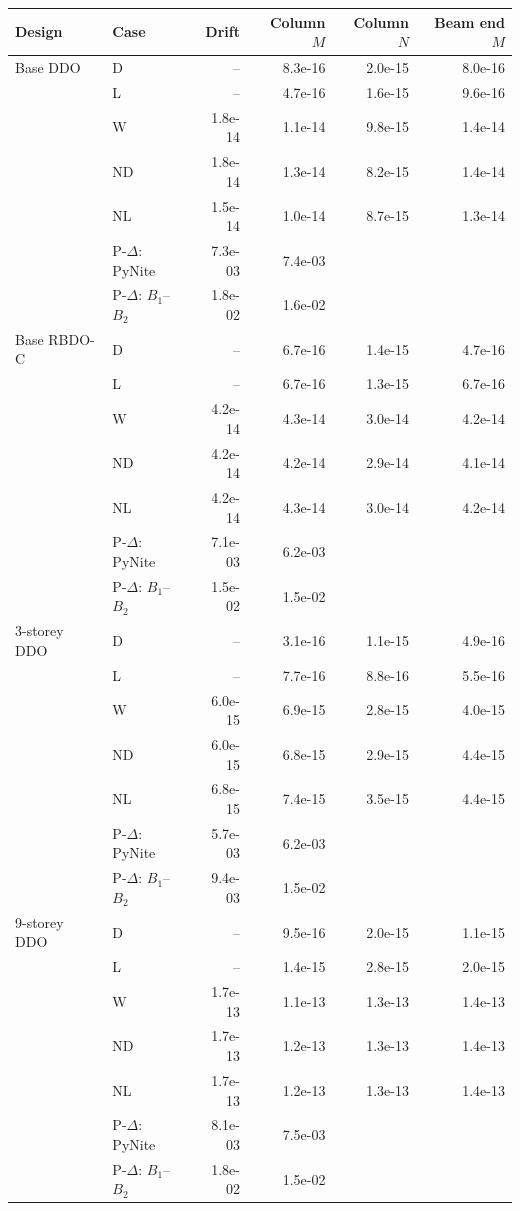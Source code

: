 \begin{tabular}{llrrrr}
\toprule
Design & Case & Drift & Column $M$ & Column $N$ & Beam end $M$ \\
\midrule
Base DDO & D & -- & 8.3e-16 & 2.0e-15 & 8.0e-16 \\
 & L & -- & 4.7e-16 & 1.6e-15 & 9.6e-16 \\
 & W & 1.8e-14 & 1.1e-14 & 9.8e-15 & 1.4e-14 \\
 & ND & 1.8e-14 & 1.3e-14 & 8.2e-15 & 1.4e-14 \\
 & NL & 1.5e-14 & 1.0e-14 & 8.7e-15 & 1.3e-14 \\
 & P-$\Delta$: PyNite & 7.3e-03 & 7.4e-03 & & \\
 & P-$\Delta$: $B_1$--$B_2$ & 1.8e-02 & 1.6e-02 & & \\
\midrule
Base RBDO-C & D & -- & 6.7e-16 & 1.4e-15 & 4.7e-16 \\
 & L & -- & 6.7e-16 & 1.3e-15 & 6.7e-16 \\
 & W & 4.2e-14 & 4.3e-14 & 3.0e-14 & 4.2e-14 \\
 & ND & 4.2e-14 & 4.2e-14 & 2.9e-14 & 4.1e-14 \\
 & NL & 4.2e-14 & 4.3e-14 & 3.0e-14 & 4.2e-14 \\
 & P-$\Delta$: PyNite & 7.1e-03 & 6.2e-03 & & \\
 & P-$\Delta$: $B_1$--$B_2$ & 1.5e-02 & 1.5e-02 & & \\
\midrule
3-storey DDO & D & -- & 3.1e-16 & 1.1e-15 & 4.9e-16 \\
 & L & -- & 7.7e-16 & 8.8e-16 & 5.5e-16 \\
 & W & 6.0e-15 & 6.9e-15 & 2.8e-15 & 4.0e-15 \\
 & ND & 6.0e-15 & 6.8e-15 & 2.9e-15 & 4.4e-15 \\
 & NL & 6.8e-15 & 7.4e-15 & 3.5e-15 & 4.4e-15 \\
 & P-$\Delta$: PyNite & 5.7e-03 & 6.2e-03 & & \\
 & P-$\Delta$: $B_1$--$B_2$ & 9.4e-03 & 1.5e-02 & & \\
\midrule
9-storey DDO & D & -- & 9.5e-16 & 2.0e-15 & 1.1e-15 \\
 & L & -- & 1.4e-15 & 2.8e-15 & 2.0e-15 \\
 & W & 1.7e-13 & 1.1e-13 & 1.3e-13 & 1.4e-13 \\
 & ND & 1.7e-13 & 1.2e-13 & 1.3e-13 & 1.4e-13 \\
 & NL & 1.7e-13 & 1.2e-13 & 1.3e-13 & 1.4e-13 \\
 & P-$\Delta$: PyNite & 8.1e-03 & 7.5e-03 & & \\
 & P-$\Delta$: $B_1$--$B_2$ & 1.8e-02 & 1.5e-02 & & \\
\bottomrule
\end{tabular}